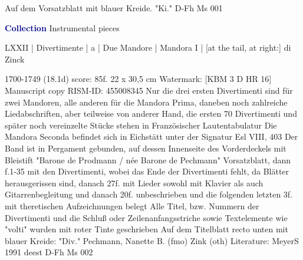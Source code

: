 \documentclass[twocolumn]{book}
\begin{document}
\newline Auf dem Vorsatzblatt mit blauer Kreide. "Ki."
\newline D-Fh  Ms 001
\newline \par \vspace{7pt} \textcolor{darkblue}{\textbf{Collection}}
 Instrumental pieces    
\newline \begin{itshape} LXXII | Divertimente | a | Due Mandore | Mandora I | [at the tail, at right:] di Zinck\end{itshape} 
\newline \textcolor{darkblue}{}  1700-1749 (18.1d)  score: 85f.  22 x 30,5 cm
\newline Watermark: [KBM 3 D HR 16]
\newline Manuscript copy
\newline RISM-ID: 455008345
\newline Nur die drei ersten Divertimenti sind für zwei Mandoren, alle anderen für die Mandora Prima, daneben noch zahlreiche Liedabschriften, aber teilweise von anderer Hand, die ersten 70 Divertimenti und später noch vereinzelte Stücke stehen in Französischer Lautentabulatur
\newline Die Mandora Seconda befindet sich in Eichstätt unter der Signatur Esl VIII, 403
\newline Der Band ist in Pergament gebunden, auf dessen Innenseite des Vorderdeckels mit Bleistift "Barone de Prodmann / née Barone de Pechmann"
\newline Vorsatzblatt, dann f.1-35 mit den Divertimenti, wobei das Ende der Divertimenti fehlt, da Blätter herausgerissen sind, danach 27f. mit Lieder sowohl mit Klavier als auch Gitarrenbegleitung und danach 20f. unbeschrieben und die folgenden letzten 3f. mit theretischen Aufzeichnungen belegt
\newline Alle Titel, bzw. Nummern der Divertimenti und die Schluß oder Zeilenanfangsstriche sowie Textelemente wie "volti" wurden mit roter Tinte geschrieben
\newline Auf dem Titelblatt recto unten mit blauer Kreide: "Div."
\newline Pechmann, Nanette B.  (fmo)
\newline Zink  (oth)
\newline Literature: MeyerS 1991  deest
\newline D-Fh  Ms 002
    \clearpage  
\end{document}
